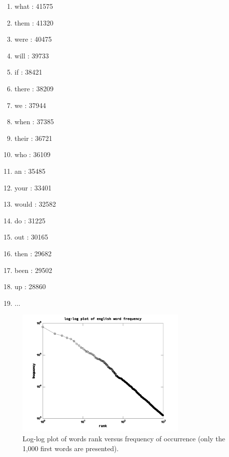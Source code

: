 \begin{tiny}
\begin{multicols}{4}
\begin{enumerate}
	\item what : 41575
	\item them : 41320
	\item were : 40475
	\item will : 39733
	\item if : 38421
	\item there : 38209
	\item we : 37944
	\item when : 37385
	\item their : 36721
	\item who : 36109
	\item an : 35485
	\item your : 33401
	\item would : 32582
	\item do : 31225
	\item out : 30165
	\item then : 29682
	\item been : 29502
	\item up : 28860
	\item[] $\ldots$
\end{enumerate}
\end{multicols}
\end{tiny}

\begin{figure}[h!]
\centering
\includegraphics[width=0.75\textwidth]{images/wordfrequency_en.pdf}
\caption{Log-log plot of words rank versus frequency of occurrence (only the 1,000 first words are presented).}
\label{fig:wordfrequency_en}
\end{figure} 

